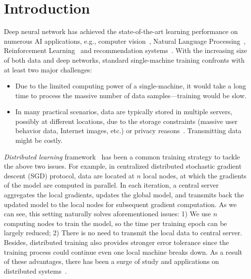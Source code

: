 \documentclass[11pt]{article}
\begin{document}
\section{Introduction}\label{sec:introduction}

Deep neural network has achieved the state-of-the-art learning performance on numerous AI applications, e.g., computer vision~\cite{Proc:GAN_NIPS14,Proc:Resnet_CVPR16,CV_review18}, Natural Language Processing~\cite{Proc:Graves_ICASSP13,NLP_review18,sentiment_review18}, Reinforcement Learning~\cite{Arxiv:MnihKSGAWR13,AlphaGo_17} and recommendation systems~\cite{Proc:Covington_2016,Article:Wei_2017}. With the increasing size of both data and deep networks, standard single-machine training confronts with at least two major challenges:
\begin{itemize}
    \item Due to the limited computing power of a single-machine, it would take a long time to process the massive number of data samples---training would be slow.
  
    \item In many practical scenarios, data are typically stored in multiple servers, possibly at different locations, due to the storage constraints (massive user behavior data, Internet images, etc.) or privacy reasons~\cite{Proc:Chang18}. Transmitting data might be costly.
\end{itemize}
\textit{Distributed learning} framework~\cite{Proc:Dean_NIPS12} has been a common training strategy to tackle the above two issues. For example, in centralized distributed stochastic gradient descent (SGD) protocol, data are located at $n$ local nodes, at which the gradients of the model are computed in parallel. In each iteration, a central server aggregates the local gradients, updates the global model, and transmits back the updated model to the local nodes for subsequent gradient computation. As we can see, this setting naturally solves aforementioned issues: 1) We use $n$ computing nodes to train the model, so the time per training epoch can be largely reduced; 2) There is no need to transmit the local data to central server. Besides, distributed training also provides stronger error tolerance since the training process could continue even one local machine breaks down. As a result of these advantages, there has been a surge of study and applications on distributed systems~\cite{boyd2011distributed,nedic2009distributed,duchi2011dual,Arxiv:Goyal17,hong2017prox,lu2019gnsd,koloskova2019decentralized}.
\end{document}
